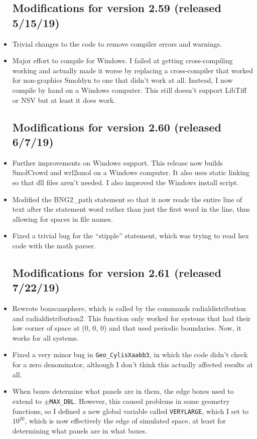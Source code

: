 \documentclass {scrbook}
\newcommand {\ttt} {\texttt}
\begin{document}
\begin{itemize}
\subsection{Modifications for version 2.59 (released 5/15/19)}
\item Trivial changes to the code to remove compiler errors and warnings.
\item Major effort to compile for Windows. I failed at getting cross-compiling working and actually made it worse by replacing a cross-compiler that worked for non-graphics Smoldyn to one that didn't work at all. Instead, I now compile by hand on a Windows computer. This still doesn't support LibTiff or NSV but at least it does work.

\subsection{Modifications for version 2.60 (released 6/7/19)}
\item Further improvements on Windows support. This release now builds SmolCrowd and wrl2smol on a Windows computer. It also uses static linking so that dll files aren't needed. I also improved the Windows install script.
\item Modified the BNG2\_path statement so that it now reads the entire line of text after the statement word rather than just the first word in the line, thus allowing for spaces in file names.
\item Fixed a trivial bug for the ``stipple'' statement, which was trying to read hex code with the math parser.

\subsection{Modifications for version 2.61 (released 7/22/19)}
\item Rewrote boxscansphere, which is called by the commands radialdistribution and radialdistribution2. This function only worked for systems that had their low corner of space at (0, 0, 0) and that used periodic boundaries. Now, it works for all systems.
\item Fixed a very minor bug in \ttt{Geo\_CylisXaabb3}, in which the code didn't check for a zero denominator, although I don't think this actually affected results at all.
\item When boxes determine what panels are in them, the edge boxes used to extend to $\pm$\ttt{MAX\_DBL}. However, this caused problems in some geometry functions, so I defined a new global variable called \ttt{VERYLARGE}, which I set to $10^{20}$, which is now effectively the edge of simulated space, at least for determining what panels are in what boxes.


\end{itemize}
\end{document}
